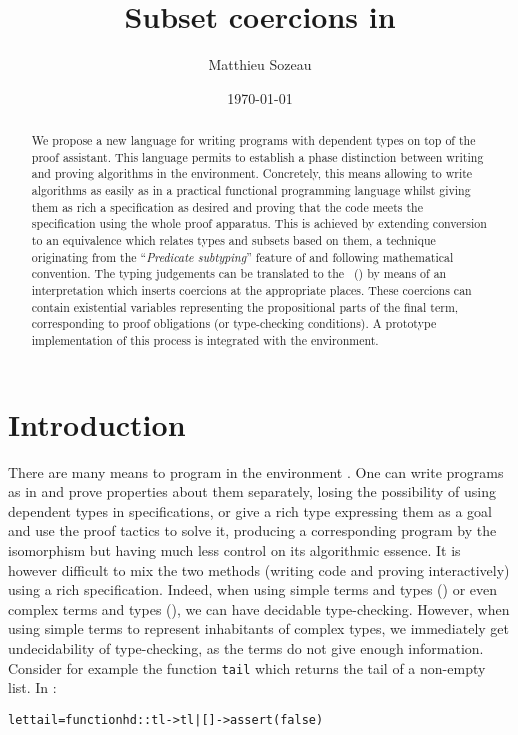 \documentclass{llncs}
\author{Matthieu Sozeau}
\institute{Universit\'e Paris Sud, CNRS, Laboratoire LRI, UMR 8623,
  Orsay, F-91405\\
  INRIA Futurs, ProVal, Parc Orsay Universit\'e, F-91893
  \\\email{sozeau@lri.fr}}
\title{Subset coercions in \Coq} %
\date{\today}
\newenvironment{code}{\begin{alltt}}{\end{alltt}}
\def\id#1{\texttt{#1}}
\begin{document}
\maketitle

\begin{abstract}
  We propose a new language for writing programs with dependent
  types on top of the \Coq proof assistant. This language permits
  to establish a phase distinction between writing and proving
  algorithms in the \Coq{} environment.  Concretely, this means allowing
  to write algorithms as easily as in a practical functional programming
  language whilst giving them as rich a specification as desired and
  proving that the code meets the specification using the whole \Coq{}
  proof apparatus. This is achieved by extending conversion to an
  equivalence which relates types and subsets based on them, a technique
  originating from the ``\emph{Predicate subtyping}'' feature of \PVS{}
  and following mathematical convention. The typing judgements can be
  translated to the \CICfull~(\CIC{}) by means of an interpretation
  which inserts coercions at the appropriate places. These coercions can
  contain existential variables representing the propositional parts of
  the final term, corresponding to proof obligations (or \PVS{}
  type-checking conditions). A prototype implementation of this process
  is integrated with the \Coq{} environment.
\end{abstract}

\section{Introduction}
There are many means to program in the \Coq{} environment \cite{CoqArt}. One
can write programs as in \ML{} and prove properties about them
separately, losing the possibility of using dependent types in
specifications, or give a rich type expressing them as a goal and use the
proof tactics to solve it, producing a corresponding program by the
\CurryHoward isomorphism but having much less control on its algorithmic
essence. It is however difficult to mix the two methods
(writing code and proving interactively) using a rich specification. 
Indeed, when using simple terms and types (\ML{}) or even complex terms and
types (\Coq{}), we can have decidable type-checking. However, when using
simple terms to represent inhabitants of complex types, we immediately get
undecidability of type-checking, as the terms do not give enough
information. Consider for example the function \id{tail} which returns
the tail of a non-empty list. In \ML{}:
\begin{code}
  let tail = function hd :: tl -> tl | [] -> assert(false)
\end{code}
\end{document}
